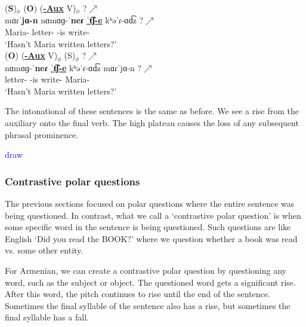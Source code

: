\begin{exe}
	\ex \begin{xlist}
		\ex \glll   (\textbf{S})$_\phi$ ({\textbf{O}}) (\underline{\textbf{{\neggloss}-Aux}} V)$_\phi$ ?$\nearrow$ \\
		mɑɾˈ\textbf{jɑ-n} {nɑ{mɑɡ}-ˈ\textbf{neɾ}} \underline{ˈ\textbf{t͡ʃ-e}} kʰəˈɾ-ɑd͡z   ?$\nearrow$ \\
		Maria-{} letter-{\pl} {\neggloss}-is write-{\rptcp}  \\
		\trans `Hasn't Maria   written letters?'
		\label{example:intonation:focus:polar:neg:periph:sov}
		\\ 
		\ex \glll  ({\textbf{O}}) (\underline{\textbf{{\neggloss}-Aux}} V)$_\phi$   ({S})$_\phi$ ?$\nearrow$ \\
		{nɑ{mɑɡ}-ˈ\textbf{neɾ}} \underline{ˈ\textbf{t͡ʃ-e}} kʰəˈɾ-ɑd͡z mɑɾˈ{jɑ-n}    ?$\nearrow$ \\
		letter-{\pl} {\neggloss}-is write-{\rptcp} Maria-{}   \\
		\trans `Hasn't Maria written letters?' 
		\label{example:intonation:focus:polar:neg:periph:ovs}
		\\ 
		
	\end{xlist}
\end{exe}

The intonational of these sentences is the same as before. We see a rise from the auxiliary onto the final verb. The high plateau causes the loss of any  subsequent phrasal prominence. 

\textcolor{blue}{draw}






\subsubsection{Contrastive polar questions} \label{section:intonation:focus:polar:contrastive}

The previous sections focused on polar questions where the entire sentence was being questioned. In contrast, what we call a `contrastive polar question' is when some specific word in the sentence is being questioned. Such questions are like English `Did you read the BOOK?' where we question whether a book was read vs. some other entity. 

For Armenian, we can create a contrastive polar question by questioning any word, such as the subject or object. The questioned word gets a significant rise. After this word, the pitch continues to rise until the end of the sentence. Sometimes the final syllable of the sentence also has a rise, but sometimes the final syllable has a fall. 


